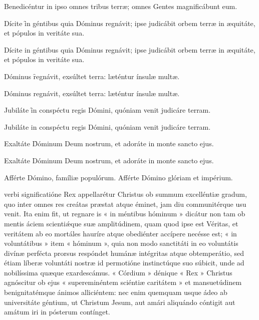 \documentclass[fontsize=8pt,paper=A6,twoside,BCOR=1mm,DIV=22,headinclude]{scrarticle}
\begin{document}
\begin{multicols}{2}
{

\A Benedicéntur in ipso omnes tribus terræ; omnes Gentes magnificábunt eum.

\A Dícite \f in géntibus quia Dóminus regnávit; ipse judicábit orbem terræ in æquitáte, et pópulos in veritáte sua.




\A Dícite in géntibus quia Dóminus regnávit; ipse judicábit orbem terræ in æquitáte, et pópulos in veritáte sua.

\A Dóminus \f regnávit, exsúltet terra: læténtur ínsulæ multæ.



\A Dóminus regnávit, exsúltet terra: læténtur ínsulæ multæ.

\A Jubiláte \f in conspéctu regis Dómini, quóniam venit judicáre terram.



\A Jubiláte in conspéctu regis Dómini, quóniam venit judicáre terram.

\A Exaltáte \f Dóminum Deum nostrum, et adoráte in monte sancto ejus.



\A Exaltáte Dóminum Deum nostrum, et adoráte in monte sancto ejus.

\V Afférte Dómino, famíliæ populórum.
\R Afférte Dómino glóriam et impérium.

}

{
 verbi significatióne Rex appellarétur Christus ob summum excelléntiæ gradum, quo inter omnes res creátas præstat atque éminet, jam diu communitérque usu venit. Ita enim fit, ut regnare is « in méntibus hóminum » dicátur non tam ob mentis áciem scientiǽque suæ amplitúdinem, quam quod ipse est Véritas, et veritátem ab eo mortáles hauríre atque obediénter accípere necésse est; « in voluntátibus » item « hóminum », quia non modo sanctitáti in eo voluntátis divínæ perfécta prorsus respóndet humánæ intégritas atque obtemperátio, sed étiam líberæ voluntáti nostræ id permotióne instinctúque suo súbicit, unde ad nobilíssima quæque exardescámus. « Córdium » dénique « Rex » Christus agnóscitur ob ejus « supereminéntem sciéntiæ caritátem » et mansuetúdinem benignitatémque ánimos alliciéntem: nec enim quemquam usque ádeo ab universitáte géntium, ut Christum Jesum, aut amári aliquándo cóntigit aut amátum iri in pósterum contínget.

}
\end{multicols}
\end{document}
